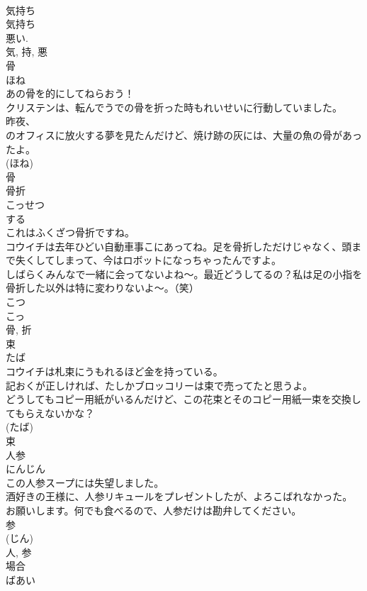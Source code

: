 \documentclass[8pt]{extreport}
\begin{document}
\begin{CJK}{UTF8}{min}
\\	気持ち 
\\	気持ち 
\\	悪い. 
\\	気, 持, 悪	
\\	骨	
\\	ほね	
\\	あの骨を的にしてねらおう！	
\\	クリステンは、転んでうでの骨を折った時もれいせいに行動していました。	
\\	昨夜、
\\	のオフィスに放火する夢を見たんだけど、焼け跡の灰には、大量の魚の骨があったよ。	
\\	(ほね) 
\\	骨	
\\	骨折	
\\	こっせつ	
\\	する 
\\	これはふくざつ骨折ですね。	
\\	コウイチは去年ひどい自動車事こにあってね。足を骨折しただけじゃなく、頭まで失くしてしまって、今はロボットになっちゃったんですよ。	
\\	しばらくみんなで一緒に会ってないよね〜。最近どうしてるの？私は足の小指を骨折した以外は特に変わりないよ〜。（笑）	
\\	こつ 
\\	こっ 
\\	骨, 折	
\\	束	
\\	たば	
\\	コウイチは札束にうもれるほど金を持っている。	
\\	記おくが正しければ、たしかブロッコリーは束で売ってたと思うよ。	
\\	どうしてもコピー用紙がいるんだけど、この花束とそのコピー用紙一束を交換してもらえないかな？	
\\	(たば) 
\\	束	
\\	人参	
\\	にんじん	
\\	この人参スープには失望しました。	
\\	酒好きの王様に、人参リキュールをプレゼントしたが、よろこばれなかった。	
\\	お願いします。何でも食べるので、人参だけは勘弁してください。	
\\	参 
\\	(じん) 
\\	人, 参	
\\	場合	
\\	ばあい	

\end{CJK}
\end{document}

